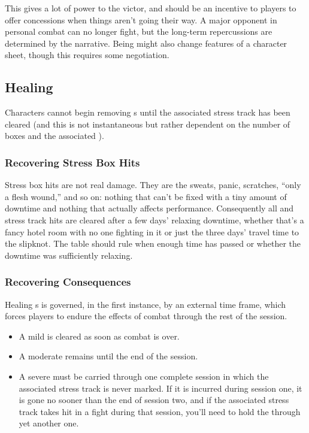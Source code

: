 This gives a lot of power to the victor, and should be an incentive to players to offer concessions when things aren't going their way. A major opponent \TakenOut{} in personal combat can no longer fight, but the long-term repercussions are determined by the narrative. Being \TakenOut{} might also change features of a character sheet, though this requires some negotiation.

\subsection{Healing}
\label{sec:personal-combat-healing}

Characters cannot begin removing \Consequence{}s until the associated stress track has been cleared (and this is not instantaneous but rather dependent on the number of boxes and the associated \Skill{}).

\subsubsection{Recovering Stress Box Hits}

Stress box hits are not real damage. They are the sweats, panic, scratches, ``only a flesh wound,'' and so on: nothing that can't be fixed with a tiny amount of downtime and nothing that actually affects performance. Consequently all \Health{} and \Composure{} stress track hits are cleared after a few days' relaxing downtime, whether that's a fancy hotel room with no one fighting in it or just the three days' travel time to the slipknot. The table should rule when enough time has passed or whether the downtime was sufficiently relaxing.

\subsubsection{Recovering Consequences}

Healing \Consequence{}s is governed, in the first instance, by an external time frame, which forces players to endure the effects of combat through the rest of the session.
\begin{itemize}
\item A mild \Consequence{} is cleared as soon as combat is over.
\item A moderate \Consequence{} remains until the end of the session.
\item A severe \Consequence{} must be carried through one complete session in which the associated stress track is never marked. If it is incurred during session one, it is gone no sooner than the end of session two, and if the associated stress track takes hit in a fight during that session, you'll need to hold the \Consequence{} through yet another one.
\end{itemize}

